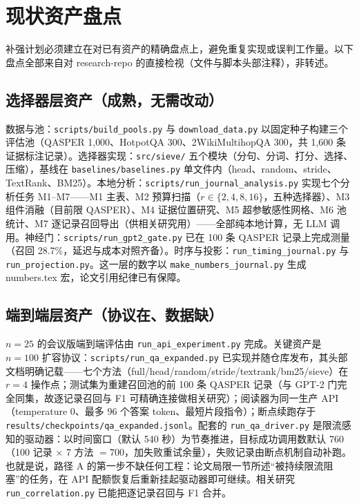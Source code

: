 \section{现状资产盘点}

补强计划必须建立在对已有资产的精确盘点上，避免重复实现或误判工作量。以下盘点全部来自对 research-repo 的直接检视（文件与脚本头部注释），非转述。

\subsection{选择器层资产（成熟，无需改动）}

数据与池：\texttt{scripts/build\_pools.py} 与 \texttt{download\_data.py} 以固定种子构建三个评估池（QASPER 1{,}000、HotpotQA 300、2WikiMultihopQA 300，共 1{,}600 条证据标注记录）。选择器实现：\texttt{src/sieve/} 五个模块（分句、分词、打分、选择、压缩），基线在 \texttt{baselines/baselines.py} 单文件内（head、random、stride、TextRank、BM25）。本地分析：\texttt{scripts/run\_journal\_analysis.py} 实现七个分析任务 M1--M7——M1 主表、M2 预算扫描（$r\in\{2,4,8,16\}$，五种选择器）、M3 组件消融（目前限 QASPER）、M4 证据位置研究、M5 超参敏感性网格、M6 池统计、M7 逐记录召回导出（供相关研究用）——全部纯本地计算，无 LLM 调用。神经门：\texttt{scripts/run\_gpt2\_gate.py} 已在 100 条 QASPER 记录上完成测量（召回 28.7\%，延迟与成本对照齐备）。时序与投影：\texttt{run\_timing\_journal.py} 与 \texttt{run\_projection.py}。这一层的数字以 \texttt{make\_numbers\_journal.py} 生成 numbers.tex 宏，论文引用纪律已有保障。

\subsection{端到端层资产（协议在、数据缺）}

$n{=}25$ 的会议版端到端评估由 \texttt{run\_api\_experiment.py} 完成。关键资产是 $n{=}100$ 扩容协议：\texttt{scripts/run\_qa\_expanded.py} 已实现并随仓库发布，其头部文档明确记载——七个方法（full/head/random/stride/textrank/bm25/sieve）在 $r{=}4$ 操作点；测试集为重建召回池的前 100 条 QASPER 记录（与 GPT-2 门完全同集，故逐记录召回与 F1 可精确连接做相关研究）；阅读器为同一生产 API（temperature 0、最多 96 个答案 token、最短片段指令）；断点续跑存于 \texttt{results/checkpoints/qa\_expanded.jsonl}。配套的 \texttt{run\_qa\_driver.py} 是限流感知的驱动器：以时间窗口（默认 540 秒）为节奏推进，目标成功调用数默认 760（100 记录 $\times$ 7 方法 $= 700$，加失败重试余量），失败记录由断点机制自动补跑。也就是说，路径 A 的第一步不缺任何工程：论文局限一节所述``被持续限流阻塞''的任务，在 API 配额恢复后重新挂起驱动器即可继续。相关研究 \texttt{run\_correlation.py} 已能把逐记录召回与 F1 合并。

